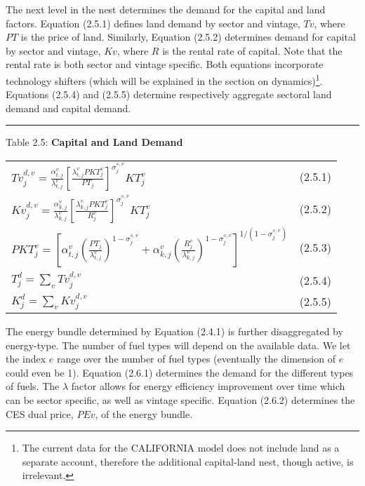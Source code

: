 \documentclass{article}
\begin{document}
The next level in the nest determines the demand for the capital and land factors. Equation (2.5.1) defines land demand by sector and vintage, $Tv$, where $PT$ is the price of land. Similarly, Equation (2.5.2) determines demand for capital by sector and vintage, $Kv$, where $R$ is the rental rate of capital. Note that the rental rate is both sector and vintage specific. Both equations incorporate technology shifters (which will be explained in the section on dynamics)\footnote{The current data for the CALIFORNIA model does not include land as a separate account, therefore the additional capital-land nest, though active, is irrelevant.}.  Equations (2.5.4) and (2.5.5) determine respectively aggregate sectoral land demand and capital demand.

\noindent\rule{\linewidth}{0.4pt}
\begin{center}
\begin{large}

{\centering Table 2.5: \textbf{Capital and Land Demand
} \par}

\begin{tabular}{>{\raggedright}p{} l}

$Tv^{d,v}_j = \frac {\alpha^v_{t,j}} {\lambda^v_{t,j}} \left   [\frac {\lambda^v_{t,j}PKT^v_j} {PT_j} \right]^{\sigma^{s,v}_j} KT^v_j$ & (2.5.1) \\

$Kv^{d,v}_j = \frac {\alpha^v_{k,j}} {\lambda^v_{k,j}} \left   [\frac {\lambda^v_{k,j}PKT^v_j} {R^v_j} \right]^{\sigma^{s,v}_j} KT^v_j$ & (2.5.2)\\[15pt]

$PKT^v_j = \left[\alpha^v_{t,j} \left(\frac{PT_j}{\lambda^v_{t,j}} \right)^{1-\sigma^{s,v}_j} + \alpha^v_{k,j} \left(\frac{R^v_j}{\lambda^v_{k,j}}\right)^{1-\sigma^{s,v}_j} \right]^{1/({1-\sigma^{s,v}_j})}$ & (2.5.3) \\[10pt]

$T^d_j = \displaystyle \sum_v Tv^{d,v}_j$ & (2.5.4) \\[10pt]

$K^d_j = \displaystyle \sum_v Kv^{d,v}_j$ & (2.5.5) \\[10pt]

\hline
\end{tabular}
\end{large}
\end{center}

The energy bundle determined by Equation (2.4.1) is further disaggregated by energy-type. The number of fuel types will depend on the available data. We let the index $e$ range over the number of fuel types (eventually the dimension of $e$ could even be 1). Equation (2.6.1) determines the demand for the different types of fuels. The $\lambda$ factor allows for energy efficiency improvement over time which can be sector specific, as well as vintage specific. Equation (2.6.2) determines the CES dual price, $PEv$, of the energy bundle.
\end{document}
